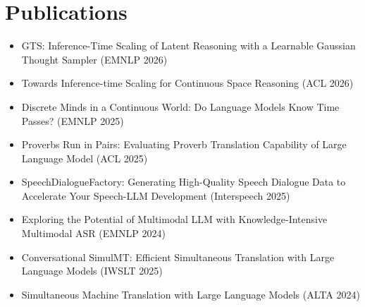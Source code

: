 \documentclass{resume_en_tm}
\begin{document}
\section{Publications}
\begin{itemize}[parsep=0.2ex]
    \item GTS: Inference-Time Scaling of Latent Reasoning with a Learnable Gaussian Thought Sampler (EMNLP 2026)
    \item Towards Inference-time Scaling for Continuous Space Reasoning (ACL 2026)
    \item Discrete Minds in a Continuous World: Do Language Models Know Time Passes? (EMNLP 2025)
    \item Proverbs Run in Pairs: Evaluating Proverb Translation Capability of Large Language Model (ACL 2025)
    \item SpeechDialogueFactory: Generating High-Quality Speech Dialogue Data to Accelerate Your Speech-LLM Development (Interspeech 2025)
    \item Exploring the Potential of Multimodal LLM with Knowledge-Intensive Multimodal ASR (EMNLP 2024)
    \item Conversational SimulMT: Efficient Simultaneous Translation with Large Language Models (IWSLT 2025)
    \item Simultaneous Machine Translation with Large Language Models (ALTA 2024)
\end{itemize}
\end{document}
